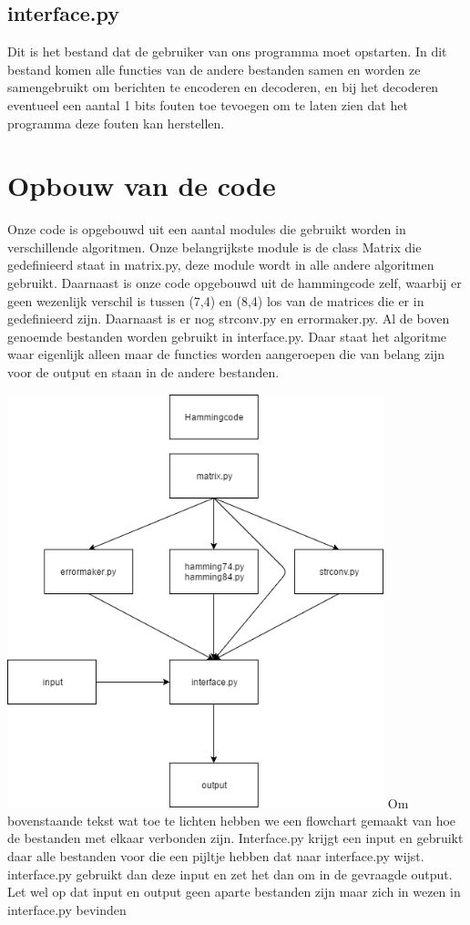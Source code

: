 \documentclass[a4paper]{article}
\begin{document}
\subsection{interface.py}
	Dit is het bestand dat de gebruiker van ons programma moet opstarten. In dit bestand komen alle functies van de andere bestanden samen en worden ze samengebruikt om berichten te encoderen en decoderen, en bij het decoderen eventueel een aantal 1 bits fouten toe tevoegen om te laten zien dat het programma deze fouten kan herstellen.
	
\section{Opbouw van de code}
Onze code is opgebouwd uit een aantal modules die gebruikt worden in verschillende algoritmen. Onze belangrijkste module is de class Matrix die gedefinieerd staat in matrix.py, deze module wordt in alle andere algoritmen gebruikt. Daarnaast is onze code opgebouwd uit de hammingcode zelf, waarbij er geen wezenlijk verschil is tussen (7,4) en (8,4) los van de matrices die er in gedefinieerd zijn. Daarnaast is er nog strconv.py en errormaker.py. Al de boven genoemde bestanden worden gebruikt in interface.py. Daar staat het algoritme waar eigenlijk alleen maar de functies worden aangeroepen die van belang zijn voor de output en staan in de andere bestanden.

\includegraphics[height=12cm]{diagram}
Om bovenstaande tekst wat toe te lichten hebben we een flowchart gemaakt van hoe de bestanden met elkaar verbonden zijn. Interface.py krijgt een input en gebruikt daar alle bestanden voor die een pijltje hebben dat naar interface.py wijst. interface.py gebruikt dan deze input en zet het dan om in de gevraagde output. Let wel op dat input en output geen aparte bestanden zijn maar zich in wezen in interface.py bevinden
\end{document}
